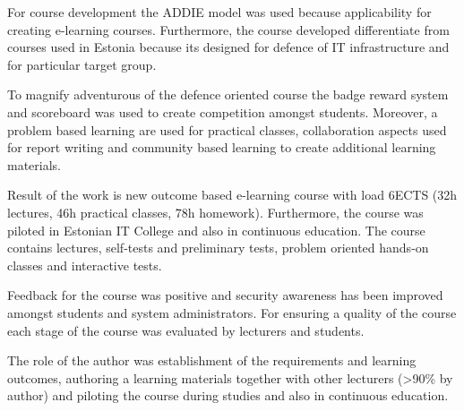 For course development the \gls{ADDIE} model was used because applicability for creating e-learning courses. Furthermore, the course developed differentiate from courses used in Estonia because its designed for defence of IT infrastructure and for particular target group.

To magnify adventurous of the defence oriented course the badge reward system and scoreboard was used to create competition amongst students. Moreover, a problem based learning are used for practical classes, collaboration aspects used for report writing and community based learning to create additional learning materials.

Result of the work is new outcome based e-learning course with load 6ECTS (32h lectures, 46h practical classes, 78h homework). Furthermore, the course was piloted in Estonian IT College and also in continuous education. The course contains lectures, self-tests and preliminary tests, problem oriented hands-on classes and interactive tests.

Feedback for the course was positive and security awareness has been improved amongst students and system administrators. For ensuring a quality of the course each stage of the course was evaluated by lecturers and students.

The role of the author was establishment of the requirements and learning outcomes, authoring a learning materials together with other lecturers (>90\% by author) and piloting the course during studies and also in continuous education. 
